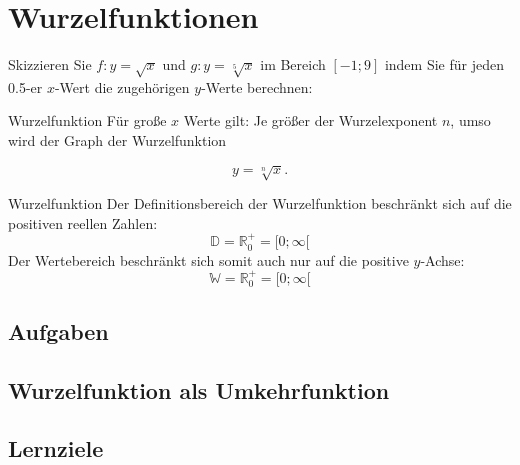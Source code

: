 \section{Wurzelfunktionen}




Skizzieren Sie $f: y = \sqrt{x}$ und $g: y=\sqrt[5]{x}$ im Bereich $[-1; 9]$ indem Sie für jeden 0.5-er $x$-Wert die zugehörigen $y$-Werte berechnen:


\begin{bemerkung}{Wurzelfunktion}{}
Für große $x$ Werte gilt: Je größer der Wurzelexponent $n$, umso
 wird der Graph der Wurzelfunktion

$$y=\sqrt[n]{x}.$$ 

\end{bemerkung}


\begin{definition}{Wurzelfunktion}{}
  Der Definitionsbereich der Wurzelfunktion beschränkt sich auf die
  positiven reellen Zahlen:
  $$\mathbb{D} = \mathbb{R}_0^{+} = [0;\infty[$$
      Der Wertebereich beschränkt sich somit auch nur auf die positive $y$-Achse:
  $$\mathbb{W} = \mathbb{R}_0^{+} = [0;\infty[$$
      
\end{definition}

\subsection*{Aufgaben}



\newpage

\subsection{Wurzelfunktion als
  Umkehrfunktion}

\subsection*{Lernziele}

